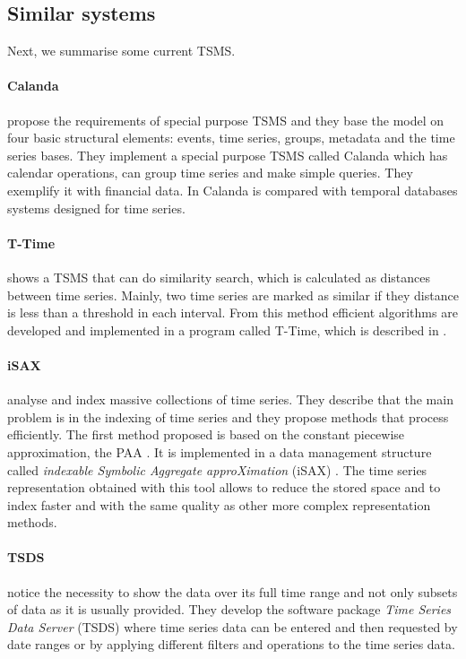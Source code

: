 \subsection{Similar systems}
Next, we summarise some current TSMS.

\paragraph{Calanda} \textcite{dreyer94} propose the requirements of special purpose TSMS and they  base the model on four basic structural elements: events, time series, groups, metadata and the time series bases. They implement a special purpose TSMS \parencite{dreyer94b,dreyer95,dreyer95b} called Calanda which has calendar operations, can group time series and make simple queries. They exemplify it with financial data. In \cite{schmidt95} Calanda is compared with temporal databases systems designed for time series.


\paragraph{T-Time}  \textcite{assfalg08:thesis} shows a TSMS that can do similarity search, which is calculated as distances between time series. Mainly, two time series are marked as similar if they distance is less than a threshold in each interval. From this method efficient algorithms are developed and implemented in a program called T-Time, which is described in \cite{assfalg08:ttime}.

 
\paragraph{iSAX} \textcite{keogh08:isax,keogh10:isax} analyse and index massive collections of time series. They describe that the main problem is in the indexing of time series and they propose methods that process efficiently. The first method proposed is based on the constant piecewise approximation, the PAA \parencite{keogh00}. It is implemented in a data management structure called \emph{indexable Symbolic Aggregate approXimation} (iSAX) \parencite{isax}. The time series representation obtained with this tool allows to reduce the stored space and to index faster and with the same quality as other more complex representation methods.
 

\paragraph{TSDS} \textcite{weigel10} notice the necessity to show the data over its full time range and not only subsets of data as it is usually provided. 
They develop  the software package \emph{Time Series Data Server} (TSDS) \parencite{tsds} where time series data can be entered and then requested by date ranges or by applying different filters and operations to the time series data.


